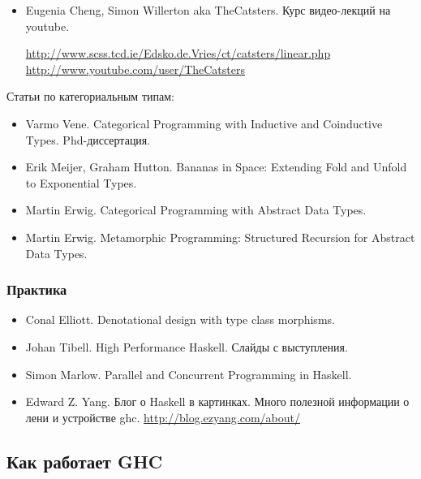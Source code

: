 \begin{itemize}

\item Eugenia Cheng, Simon Willerton aka TheCatsters. Курс видео-лекций
    на youtube. 

    \url{http://www.scss.tcd.ie/Edsko.de.Vries/ct/catsters/linear.php}
    \url{http://www.youtube.com/user/TheCatsters}
\end{itemize}

Статьи по категориальным типам:

\begin{itemize}

\item Varmo Vene. Categorical Programming 
    with Inductive and Coinductive Types. Phd-диссертация.
    
\item Erik Meijer, Graham Hutton.
    Bananas in Space: Extending Fold and Unfold to Exponential Types.

\item Martin Erwig. Categorical Programming with Abstract Data Types.

\item Martin Erwig. Metamorphic Programming: Structured Recursion 
    for Abstract Data Types.

\end{itemize}

\subsubsection{Практика}

\begin{itemize}
\item Conal Elliott. Denotational design with type class morphisms.

\item Johan Tibell. High Performance Haskell. Слайды с выступления. 

\item Simon Marlow. Parallel and Concurrent Programming in Haskell.

\item Edward Z. Yang. Блог о Haskell в картинках. Много
    полезной информации о лени и устройстве ghc.
    \url{http://blog.ezyang.com/about/}

\end{itemize}

\subsection{Как работает GHC}

